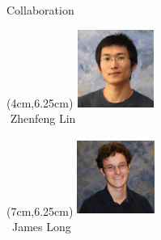 \documentclass[12pt]{beamer}
\newcommand{\w}{1in}
\newcommand{\h}{1in}
\begin{document}
\begin{frame}{Collaboration}
  \begin{textblock*}{3cm}(4cm,6.25cm) %
\includegraphics[width=\w,height=\h]{figs/zhenfeng.jpg}\\
$\, \, $Zhenfeng Lin
\end{textblock*}

  \begin{textblock*}{3cm}(7cm,6.25cm) %
\includegraphics[width=\w,height=\h]{figs/long.jpg}\\
$\, \, \, $James Long
\end{textblock*}
  

\end{frame}
\end{document}
